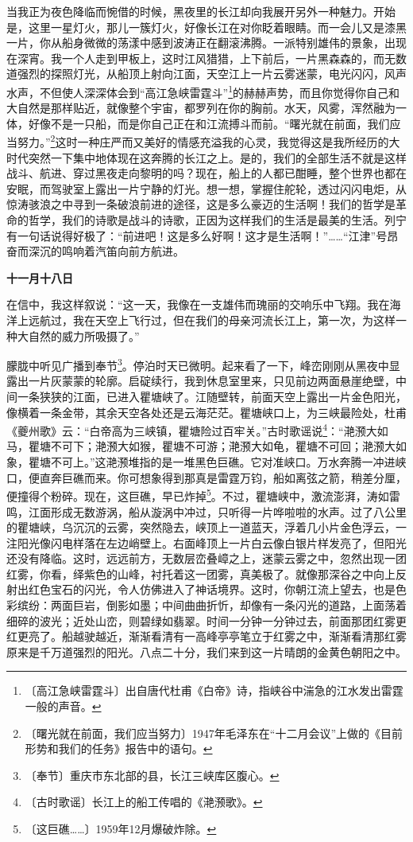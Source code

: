 \documentclass[12pt,UTF-8,openany]{ctexbook}
\begin{document}
\begin{normalsize}
    当我正为夜色降临而惋借的时候，黑夜里的长江却向我展开另外一种魅力。开始是，这里一星灯火，那儿一簇灯火，好像长江在对你眨着眼睛。而一会儿又是漆黑一片，你从船身微微的荡漾中感到波涛正在翻滚沸腾。一派特别雄伟的景象，出现在深宵。我一个人走到甲板上，这时江风猎猎，上下前后，一片黑森森的，而无数道强烈的探照灯光，从船顶上射向江面，天空江上一片云雾迷蒙，电光闪闪，风声水声，不但使人深深体会到“高江急峡雷霆斗”\footnote{〔高江急峡雷霆斗〕出自唐代杜甫《白帝》诗，指峡谷中湍急的江水发出雷霆一般的声音。}的赫赫声势，而且你觉得你自己和大自然是那样贴近，就像整个宇宙，都罗列在你的胸前。水天，风雾，浑然融为一体，好像不是一只船，而是你自己正在和江流搏斗而前。“曙光就在前面，我们应当努力。”\footnote{〔曙光就在前面，我们应当努力〕1947年毛泽东在“十二月会议”上做的《目前形势和我们的任务》报告中的语句。}这时一种庄严而又美好的情感充溢我的心灵，我觉得这是我所经历的大时代突然一下集中地体现在这奔腾的长江之上。是的，我们的全部生活不就是这样战斗、航进、穿过黑夜走向黎明的吗？现在，船上的人都已酣睡，整个世界也都在安眠，而驾驶室上露出一片宁静的灯光。想一想，掌握住舵轮，透过闪闪电炬，从惊涛骇浪之中寻到一条破浪前进的途径，这是多么豪迈的生活啊！我们的哲学是革命的哲学，我们的诗歌是战斗的诗歌，正因为这样我们的生活是最美的生活。列宁有一句话说得好极了：“前进吧！这是多么好啊！这才是生活啊！”……“江津”号昂奋而深沉的鸣响着汽笛向前方航进。
    
    \textbf{十一月十八日}
    
    在信中，我这样叙说：“这一天，我像在一支雄伟而瑰丽的交响乐中飞翔。我在海洋上远航过，我在天空上飞行过，但在我们的母亲河流长江上，第一次，为这样一种大自然的威力所吸摄了。”
    
    朦胧中听见广播到奉节\footnote{〔奉节〕重庆市东北部的县，长江三峡库区腹心。}。停泊时天已微明。起来看了一下，峰峦刚刚从黑夜中显露出一片灰蒙蒙的轮廓。启碇续行，我到休息室里来，只见前边两面悬崖绝壁，中间一条狭狭的江面，已进入瞿塘峡了。江随壁转，前面天空上露出一片金色阳光，像横着一条金带，其余天空各处还是云海茫茫。瞿塘峡口上，为三峡最险处，杜甫《夔州歌》云：“白帝高为三峡镇，瞿塘险过百牢关。”古时歌谣说\footnote{〔古时歌谣〕长江上的船工传唱的《滟滪歌》。}：“滟滪大如马，瞿塘不可下；滟滪大如猴，瞿塘不可游；滟滪大如龟，瞿塘不可回；滟滪大如象，瞿塘不可上。”这滟滪堆指的是一堆黑色巨礁。它对准峡口。万水奔腾一冲进峡口，便直奔巨礁而来。你可想象得到那真是雷霆万钧，船如离弦之箭，稍差分厘，便撞得个粉碎。现在，这巨礁，早已炸掉\footnote{〔这巨礁……〕1959年12月爆破炸除。}。不过，瞿塘峡中，激流澎湃，涛如雷鸣，江面形成无数游涡，船从漩涡中冲过，只听得一片哗啦啦的水声。过了八公里的瞿塘峡，乌沉沉的云雾，突然隐去，峡顶上一道蓝天，浮着几小片金色浮云，一注阳光像闪电样落在左边峭壁上。右面峰顶上一片白云像白银片样发亮了，但阳光还没有降临。这时，远远前方，无数层峦叠嶂之上，迷蒙云雾之中，忽然出现一团红雾，你看，绎紫色的山峰，衬托着这一团雾，真美极了。就像那深谷之中向上反射出红色宝石的闪光，令人仿佛进入了神话境界。这时，你朝江流上望去，也是色彩缤纷：两面巨岩，倒影如墨；中间曲曲折忻，却像有一条闪光的道路，上面荡着细碎的波光；近处山峦，则碧绿如翡翠。时间一分钟一分钟过去，前面那团红雾更红更亮了。船越驶越近，渐渐看清有一高峰亭亭笔立于红雾之中，渐渐看清那红雾原来是千万道强烈的阳光。八点二十分，我们来到这一片晴朗的金黄色朝阳之中。
    

\end{normalsize}
\end{document}
